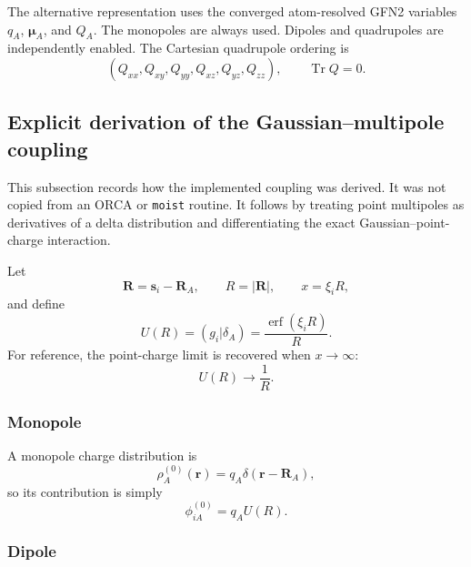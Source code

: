 \documentclass[11pt,a4paper]{article}
\newcommand{\vect}[1]{\bm{#1}}
\newcommand{\erf}{\operatorname{erf}}
\begin{document}
The alternative representation uses the converged atom-resolved GFN2 variables
$q_A$, $\vect\mu_A$, and $Q_A$.  The monopoles are always used.  Dipoles and
quadrupoles are independently enabled.  The Cartesian quadrupole ordering is
\begin{equation}
 (Q_{xx},Q_{xy},Q_{yy},Q_{xz},Q_{yz},Q_{zz}),
 \qquad \operatorname{Tr}Q=0.
\end{equation}

\subsection{Explicit derivation of the Gaussian--multipole coupling}

This subsection records how the implemented coupling was derived.  It was not
copied from an ORCA or \texttt{moist} routine.  It follows by treating point
multipoles as derivatives of a delta distribution and differentiating the
exact Gaussian--point-charge interaction.

Let
\begin{equation}
 \vect R=\vect s_i-\vect R_A,
 \qquad R=|\vect R|,
 \qquad x=\xi_iR,
\end{equation}
and define
\begin{equation}
 U(R)=(g_i|\delta_A)=\frac{\erf(\xi_iR)}{R}.
 \label{eq:screened-U}
\end{equation}
For reference, the point-charge limit is recovered when $x\to\infty$:
\begin{equation}
 U(R)\longrightarrow\frac1R.
\end{equation}

\subsubsection*{Monopole}

A monopole charge distribution is
\begin{equation}
 \rho_A^{(0)}(\vect r)=q_A\delta(\vect r-\vect R_A),
\end{equation}
so its contribution is simply
\begin{equation}
 \phi_{iA}^{(0)}=q_AU(R).
\end{equation}

\subsubsection*{Dipole}
\end{document}
